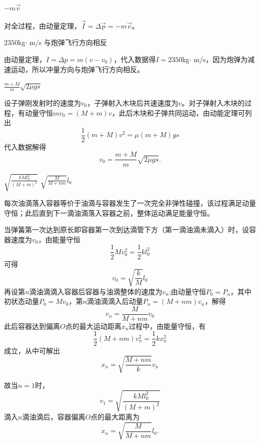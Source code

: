 \documentclass[b5paper,opensource,sourcefont,parskip]{qyxf-book}
\begin{document}
$-m\vec{v}$

\solve 对全过程，由动量定理，$\vec{I} = \Delta \vec{p} = -m\vec{v}$。

$2350$kg$\cdot$ m/s \hspace{2em} 与炮弹飞行方向相反

\solve 由动量定理，$I = \Delta p = m(v-v_0)$，代入数据得$I=2350$kg$\cdot$ m/s，因为炮弹为减速运动，所以冲量方向与炮弹飞行方向相反。

$\frac{m+M}{m}\sqrt{2 \mu gs}$

\solve 设子弹刚发射时的速度为$v_0$，子弹射入木块后共速速度为$v$。对子弹射入木块的过程，有动量守恒$mv_0=(M+m)v$，此后木块和子弹共同运动，由动能定理可列出
\begin{equation*}
\frac{1}{2}(m+M)v^2=\mu (m+M)gs
\end{equation*}
代入数据解得
\begin{equation*}
v_0=\frac{m+M}{m}\sqrt{2 \mu gs}.
\end{equation*}

$\sqrt{\frac{kMl_0^2}{(M+m)^2}}$ \hspace{4em} $\sqrt{\frac{M}{M+nm}}l_0$

\analysis 每次油滴落入容器等价于油滴与容器发生了一次完全非弹性碰撞，该过程满足动量守恒；此后直到下一滴油滴落入容器之前，整体运动满足能量守恒。

\solve 当弹簧第一次达到原长即容器第一次到达滴管下方（第一滴油滴未滴入）时，设容器速度为$v_0$，由能量守恒
\begin{equation*}
\frac{1}{2}Mv_0^2=\frac{1}{2}kl_0^2
\end{equation*}
可得
\begin{equation*}
v_0=\sqrt{\frac{k}{M}}l_0
\end{equation*}
再设第$n$滴油滴滴入容器后容器与油滴整体的速度为$v_n$;由动量守恒$P_0=P_n$，其中初状态动量$P_0=Mv_0$，第$n$滴油滴滴入后动量$P_n=(M+nm)v_n$，解得
\begin{equation*}
v_n=\frac{M}{M+nm}v_0
\end{equation*}
此后容器达到偏离$O$点的最大运动距离$x_n$过程中，由能量守恒，有
\begin{equation*}
\frac{1}{2}(M+nm)v_n^2=\frac{1}{2}kx_n^2
\end{equation*}
成立，从中可解出
\begin{equation*}
x_n=\sqrt{\frac{M+nm}{k}}v_n
\end{equation*}

故当$n=1$时，
\begin{equation*}
v_1=\sqrt{\frac{kMl_0^2}{(M+m)^2}}
\end{equation*}
滴入$n$滴油滴后，容器偏离$O$点的最大距离为
\begin{equation*}
x_n=\sqrt{\frac{M}{M+nm}}l_0.
\end{equation*}
\end{document}
